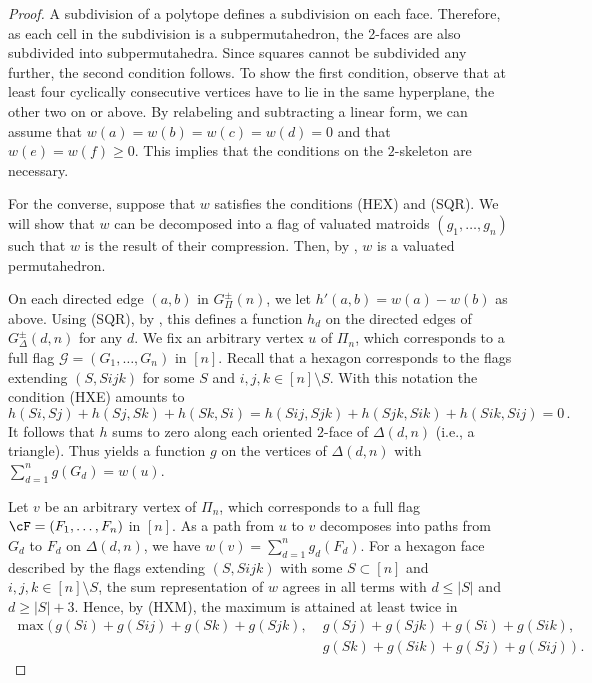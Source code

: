 \begin{proof}
	A subdivision of a polytope defines a subdivision on each face.
	Therefore, as each cell in the subdivision is a subpermutahedron, the 2-faces are also subdivided into subpermutahedra. 
	Since squares cannot be subdivided any further, the second condition follows.
	To show the first condition, observe that at least four cyclically consecutive vertices have to lie in the same hyperplane, the other two on or above. 
	By relabeling and subtracting a linear form, we can assume that $w(a) = w(b) = w(c) = w(d) = 0$ and that $w(e) = w(f) \geq 0$. 
	This implies that the conditions on the $2$-skeleton are necessary.
	
	For the converse, suppose that $w$ satisfies the conditions (HEX) and (SQR).
	We will show that $w$ can be decomposed into a flag of valuated matroids $(g_1,\dots,g_n)$ such that $w$ is the result of their compression. 
	Then, by , $w$ is a valuated permutahedron.
	
	On each directed edge $(a,b)$ in $G^\pm_\Pi(n)$, we let $h'(a,b) = w(a) - w(b)$ as above.
	Using (SQR), by , this defines a function $h_d$ on the directed edges of $G^\pm_{\Delta}(d,n)$ for any $d$.
	We fix an arbitrary vertex $u$ of $\Pi_n$, which corresponds to a full flag $\mathcal{G} = (G_1, \dots, G_n)$ in $[n]$.
	Recall that a hexagon corresponds to the flags extending $(S,S {} ijk)$ for some $S$ and $i,j,k \in [n] \setminus S$.
	With this notation the condition (HXE) amounts to
	\[
	h(S {} i, S {} j) + h(S {} j, S {} k) + h(S {} k, S {} i) =
	h(S {} ij, S {} jk) + h(S {} jk, S {} ik) + h(S {} ik, S {} ij) = 0 \,.
	\]
	It follows that $h$ sums to zero along each oriented $2$-face of $\Delta(d,n)$ (i.e., a triangle).
        Thus  yields a function $g$ on the vertices of $\Delta(d,n)$ with $\sum_{d=1}^{n}g(G_d) = w(u)$.
	
	Let $v$ be an arbitrary vertex of $\Pi_n$, which corresponds to a full flag $\cF = (F_1, \dots, F_n)$ in $[n]$.
	As a path from $u$ to $v$ decomposes into paths from $G_d$ to $F_d$ on $\Delta(d,n)$, we have $w(v)=\sum_{d = 1}^{n} g_d(F_d)$. 
	For a hexagon face described by the flags extending $(S,S {} ijk)$ with some $S \subset [n]$ and $i,j,k \in [n] \setminus S$, the sum representation of $w$ agrees in all terms with $d \leq |S|$ and $d \geq |S| + 3$.
	Hence, by (HXM), the maximum is attained at least twice in 
	\begin{equation*}
		\begin{aligned}
			\max\bigl(\, g(S {} i) + g(S {} ij) + g(S {} k) + g(S {} jk),\; & g(S {} j) + g(S {} jk) + g(S {} i) + g(S {} ik), \\
			&g(S {} k) + g(S {} ik) + g(S {} j) + g(S {} ij) \, \bigr) \;.
		\end{aligned}
	\end{equation*}
	

\end{proof}
